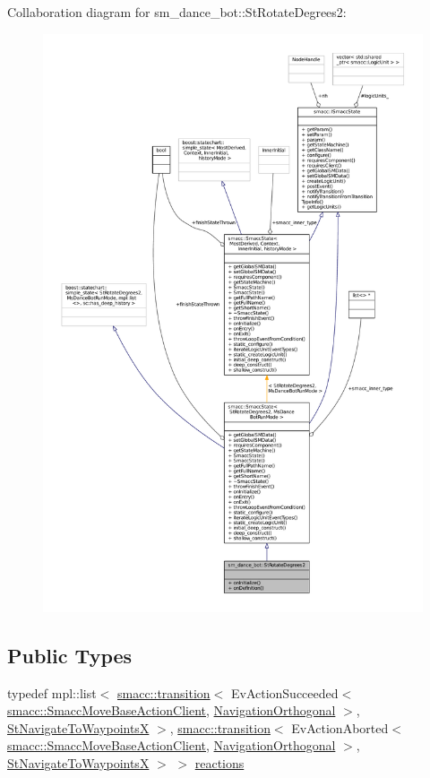 Collaboration diagram for sm\+\_\+dance\+\_\+bot\+:\+:St\+Rotate\+Degrees2\+:
\nopagebreak
\begin{figure}[H]
\begin{center}
\leavevmode
\includegraphics[width=350pt]{structsm__dance__bot_1_1StRotateDegrees2__coll__graph}
\end{center}
\end{figure}
\subsection*{Public Types}
\begin{DoxyCompactItemize}
\item 
typedef mpl\+::list$<$ \hyperlink{classsmacc_1_1transition}{smacc\+::transition}$<$ Ev\+Action\+Succeeded$<$ \hyperlink{classsmacc_1_1SmaccMoveBaseActionClient}{smacc\+::\+Smacc\+Move\+Base\+Action\+Client}, \hyperlink{classsm__dance__bot_1_1NavigationOrthogonal}{Navigation\+Orthogonal} $>$, \hyperlink{structsm__dance__bot_1_1StNavigateToWaypointsX}{St\+Navigate\+To\+WaypointsX} $>$, \hyperlink{classsmacc_1_1transition}{smacc\+::transition}$<$ Ev\+Action\+Aborted$<$ \hyperlink{classsmacc_1_1SmaccMoveBaseActionClient}{smacc\+::\+Smacc\+Move\+Base\+Action\+Client}, \hyperlink{classsm__dance__bot_1_1NavigationOrthogonal}{Navigation\+Orthogonal} $>$, \hyperlink{structsm__dance__bot_1_1StNavigateToWaypointsX}{St\+Navigate\+To\+WaypointsX} $>$ $>$ \hyperlink{structsm__dance__bot_1_1StRotateDegrees2_aaa234f0d7e5535f1fda1624a00d037b7}{reactions}
\end{DoxyCompactItemize}
